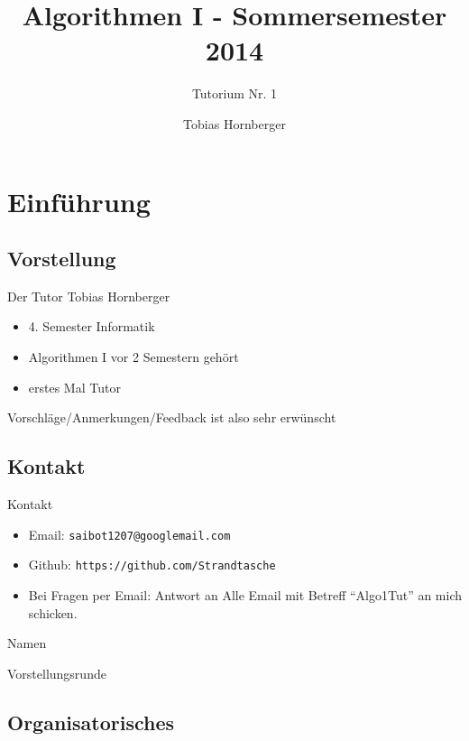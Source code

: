 \documentclass[18pt]{beamer}
\title[Algo Tutorium Nr.1]{Algorithmen I - Sommersemester 2014}
\subtitle{Tutorium Nr. 1}
\author{Tobias Hornberger}
\institute{Institut für Theoretische Informatik}
\begin{document}

\begin{frame}
\titlepage
\end{frame}


\section{Einführung}
	\subsection{Vorstellung}
	\begin{frame}{Der Tutor}
		Tobias Hornberger
		\begin{itemize}
			\item 4. Semester Informatik
			\item Algorithmen I vor 2 Semestern gehört
			\item erstes Mal Tutor
		\end{itemize}
		Vorschläge/Anmerkungen/Feedback ist also sehr erwünscht
	\end{frame}

	\subsection{Kontakt}
	\begin{frame}{Kontakt}
		\begin{itemize}
			\item Email: \texttt{saibot1207@googlemail.com}
			\item Github: \texttt{https://github.com/Strandtasche}
			\item Bei Fragen per Email: Antwort an Alle
			Email mit Betreff "`Algo1Tut"' an mich schicken.
		\end{itemize}
	\end{frame}
	
	\begin{frame}{Namen}
		\centerline{\Huge{Vorstellungsrunde}}		
	\end{frame}

	\subsection{Organisatorisches}
\end{document}
